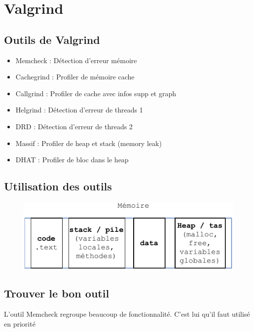 \documentclass[resume]{subfiles}
\begin{document}
\section{Valgrind}

\subsection{Outils de Valgrind}
\begin{itemize}
\item Memcheck : Détection d'erreur mémoire
\item Cachegrind : Profiler de mémoire cache
\item Callgrind : Profiler de cache avec infos supp et graph
\item Helgrind : Détection d'erreur de threads 1
\item DRD : Détection d'erreur de threads 2
\item Massif : Profiler de heap et stack (memory leak)
\item DHAT : Profiler de bloc dans le heap
\end{itemize}

\subsection{Utilisation des outils}
\begin{figure}[H]
    \centering
    \includegraphics[width=0.9\columnwidth, page=2]{Schemas-crop.pdf}
\end{figure}

\subsection{Trouver le bon outil}
L'outil Memcheck regroupe beaucoup de fonctionnalité. C'est lui qu'il faut utilisé en priorité
\end{document}
